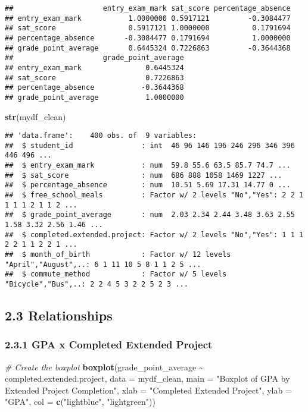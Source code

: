 \documentclass[
]{article}
\newenvironment{Shaded}{\begin{snugshade}}{\end{snugshade}}
\newcommand{\AttributeTok}[1]{\textcolor[rgb]{0.13,0.29,0.53}{#1}}
\newcommand{\CommentTok}[1]{\textcolor[rgb]{0.56,0.35,0.01}{\textit{#1}}}
\newcommand{\FunctionTok}[1]{\textcolor[rgb]{0.13,0.29,0.53}{\textbf{#1}}}
\newcommand{\NormalTok}[1]{#1}
\newcommand{\SpecialCharTok}[1]{\textcolor[rgb]{0.81,0.36,0.00}{\textbf{#1}}}
\newcommand{\StringTok}[1]{\textcolor[rgb]{0.31,0.60,0.02}{#1}}
\begin{document}
\begin{verbatim}
##                     entry_exam_mark sat_score percentage_absence
## entry_exam_mark           1.0000000 0.5917121         -0.3084477
## sat_score                 0.5917121 1.0000000          0.1791694
## percentage_absence       -0.3084477 0.1791694          1.0000000
## grade_point_average       0.6445324 0.7226863         -0.3644368
##                     grade_point_average
## entry_exam_mark               0.6445324
## sat_score                     0.7226863
## percentage_absence           -0.3644368
## grade_point_average           1.0000000
\end{verbatim}

\begin{Shaded}
\begin{Highlighting}[]
\FunctionTok{str}\NormalTok{(mydf\_clean)}
\end{Highlighting}
\end{Shaded}

\begin{verbatim}
## 'data.frame':    400 obs. of  9 variables:
##  $ student_id                : int  46 96 146 196 246 296 346 396 446 496 ...
##  $ entry_exam_mark           : num  59.8 55.6 63.5 85.7 74.7 ...
##  $ sat_score                 : num  686 888 1058 1469 1227 ...
##  $ percentage_absence        : num  10.51 5.69 17.31 14.77 0 ...
##  $ free_school_meals         : Factor w/ 2 levels "No","Yes": 2 2 1 1 1 1 2 1 1 2 ...
##  $ grade_point_average       : num  2.03 2.34 2.44 3.48 3.63 2.55 1.58 3.32 2.56 1.46 ...
##  $ completed.extended.project: Factor w/ 2 levels "No","Yes": 1 1 1 2 2 1 1 2 2 1 ...
##  $ month_of_birth            : Factor w/ 12 levels "April","August",..: 6 1 11 10 5 8 1 1 2 5 ...
##  $ commute_method            : Factor w/ 5 levels "Bicycle","Bus",..: 2 2 4 5 3 2 2 5 2 3 ...
\end{verbatim}

\subsection{2.3 Relationships}\label{relationships}

\subsubsection{2.3.1 GPA x Completed Extended
Project}\label{gpa-x-completed-extended-project}

\begin{Shaded}
\begin{Highlighting}[]
\CommentTok{\# Create the boxplot}
\FunctionTok{boxplot}\NormalTok{(grade\_point\_average }\SpecialCharTok{\textasciitilde{}}\NormalTok{ completed.extended.project, }
        \AttributeTok{data =}\NormalTok{ mydf\_clean, }
        \AttributeTok{main =} \StringTok{"Boxplot of GPA by Extended Project Completion"}\NormalTok{,}
        \AttributeTok{xlab =} \StringTok{"Completed Extended Project"}\NormalTok{,}
        \AttributeTok{ylab =} \StringTok{"GPA"}\NormalTok{,}
        \AttributeTok{col =} \FunctionTok{c}\NormalTok{(}\StringTok{"lightblue"}\NormalTok{, }\StringTok{"lightgreen"}\NormalTok{))}
\end{Highlighting}
\end{Shaded}
\end{document}
